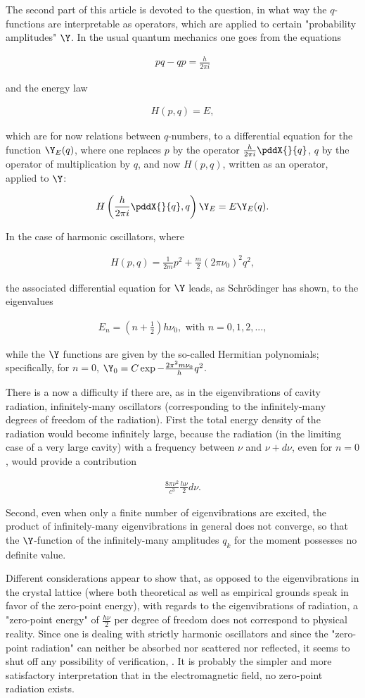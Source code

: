 \documentclass{article}
\newcommand{\uequ}[1]{
\begin{align*}
#1
\end{align*}
}
\begin{document}
The second part of this article is devoted to the question, in what way the $q$-functions are interpretable as operators, which are applied to certain "probability amplitudes" $\Y$. In the usual quantum mechanics one goes from the equations
\uequ{
pq-qp=\frac{h}{2\pi i}
}
and the energy law
\uequ{
H(p,q)=E,
}
which are for now relations between $q$-numbers, to a differential equation for the function $\Y_E(q)$, where one replaces $p$ by the operator $\frac{h}{2\pi i}\pddX{}{q}$, $q$ by the operator of multiplication by $q$, and now $H(p,q)$, written as an operator, applied to $\Y$:
\uequ{
H\left(\frac{h}{2\pi i}\pddX{}{q}, q\right)\Y_E = E\Y_E(q).
}
In the case of harmonic oscillators, where
\uequ{
H(p,q) = \frac{1}{2m}p^2 + \frac{m}{2}(2\pi\nu_0)^2 q^2,
}
the associated differential equation for $\Y$ leads, as Schrödinger has shown, to the eigenvalues
\uequ{
E_n = (n+\frac{1}{2})h \nu_0, \text{ with } n=0,1,2,...,
}
while the $\Y$ functions are given by the so-called Hermitian polynomials\sic; specifically, for $n=0$, $\Y_0 = C\exp{-\frac{2\pi^2 m \nu_0}{h}q^2}$.

There is a now a difficulty if there are, as in the eigenvibrations of cavity radiation, infinitely-many oscillators (corresponding to the infinitely-many degrees of freedom of the radiation). First the total energy density of the radiation would become infinitely large, because the radiation (in the limiting case of a very large cavity) with a frequency between $\nu$ and $\nu+d\nu$, even for $n=0$, would provide a contribution
\uequ{
\frac{8\pi\nu^2}{c^3}\frac{h\nu}{2}d\nu.
}
Second, even when only a finite number of eigenvibrations are excited, the product of infinitely-many eigenvibrations in general does not converge, so that the $\Y$-function of the infinitely-many amplitudes $q_k$ for the moment possesses no definite value.

Different considerations appear to show that, as opposed to the eigenvibrations in the crystal lattice (where both theoretical as well as empirical grounds speak in favor of the zero-point energy), with regards to the eigenvibrations of radiation, a "zero-point energy" of $\frac{h\nu}{2}$ per degree of freedom does not correspond to physical reality. Since one is dealing with strictly harmonic oscillators and since the "zero-point radiation" can neither be absorbed nor scattered nor reflected, it seems to shut off any possibility of verification, . It is probably the simpler and more satisfactory interpretation that in the electromagnetic field, no zero-point radiation exists.
\end{document}
